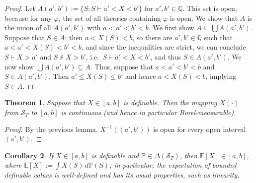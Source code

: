 \documentclass[12pt]{article}
\newcommand{\PP}{\mathbb{P}}
\newcommand{\vp}{\varphi}
\newcommand{\EE}{\mathbb{E}}
\newcommand{\QQ}{\mathbb{Q}}
\newcommand{\cS}{\mathcal{S}}
\theoremstyle{plain}
\newtheorem{theorem}{Theorem}[subsection]
\newtheorem{corollary}[theorem]{Corollary}
\theoremstyle{definition}
\theoremstyle{remark}
\begin{document}
\begin{proof}
Let $A(a',b') := \{S : S\vdash\dot a' < X < \dot b'\}$ for $a',b'\in\QQ$. This set is open, because for any $\vp$, the set of all theories containing $\vp$ is open. We show that $A$ is the union of all $A(a',b')$ with $a < a' < b' < b$.
We first show $A \subseteq \bigcup A(a',b')$. Suppose that $S\in A$; then $a < X(S) < b$, so there are $a',b'\in\QQ$ such that $a<a'<X(S)<b'<b$, and since the inequalities are strict, we can conclude $S\vdash X > \dot a'$ and $S\nvdash X > \dot b'$, i.e.\ $S\vdash\dot a' < X < \dot b'$, and thus $S\in A(a',b')$.
We now show $\bigcup A(a',b')\subseteq A$. Thus, suppose that $a < a' < b' < b$ and $S\in A(a',b')$. Then $a' \le X(S) \le b'$ and hence $a < X(S) < b$, implying $S\in A$.
\end{proof}
\begin{theorem}
Suppose that $X\in[a,b]$ is definable. Then the mapping $X(\cdot)$ from $\cS_T$ to $[a,b]$ is continuous (and hence in particular Borel-measurable).
\end{theorem}
\begin{proof}
By the previous lemma, $X^{-1}((a',b'))$ is open for every open interval $(a',b')$.
\end{proof}
\begin{corollary}
If $X\in[a,b]$ is definable and $\PP\in\Delta(\cS_T)$, then $\EE[X]\in[a,b]$, where $\EE[X] := \int X(S)\,d\PP(S)$; in particular, the expectation of bounded definable values is well-defined and has its usual properties, such as linearity.
\end{corollary}
\end{document}
